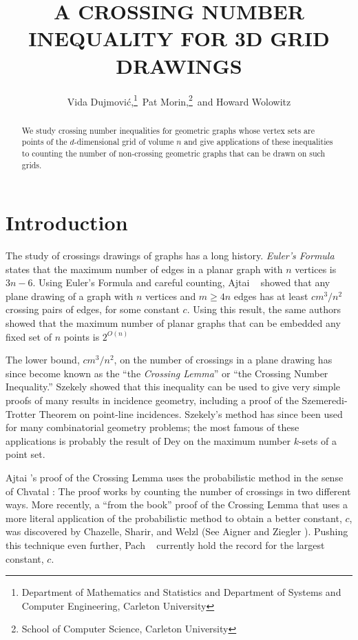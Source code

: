 \documentclass{patmorin}
\title{\MakeUppercase{A Crossing Number Inequality for 3D Grid Drawings}}
\author{Vida Dujmovi\'c,\thanks{Department of Mathematics and Statistics
and Department of Systems and Computer Engineering, Carleton University}\, Pat Morin,\thanks{School of Computer Science, Carleton University}\, and Howard Wolowitz}
\begin{document}
\maketitle

\begin{abstract}
   We study crossing number inequalities for geometric graphs whose
   vertex sets are points of the $d$-dimensional grid of volume $n$
   and give applications of these inequalities to counting the number
   of non-crossing geometric graphs that can be drawn on such grids.
\end{abstract}

\section{Introduction}

The study of crossings drawings of graphs has a long history.
\emph{Euler's Formula} states that the maximum number of edges in a
planar graph with $n$ vertices is $3n-6$.  Using Euler's Formula and
careful counting, Ajtai \etal\ \cite{S} showed that any plane drawing of
a graph with $n$ vertices and $m\ge 4n$ edges has at least $c m^3/n^2$
crossing pairs of edges, for some constant $c$.  Using this result,
the same authors showed that the maximum number of planar graphs that
can be embedded any fixed set of $n$ points is $2^{O(n)}$

The lower bound, $cm^3/n^2$, on the number of crossings in a plane drawing
has since become known as the ``the \emph{Crossing Lemma}'' or ``the Crossing
Number Inequality.''  Szekely \cite{s} showed that this inequality
can be used to give very simple proofs of many results in incidence
geometry, including a proof of the Szemeredi-Trotter Theorem on point-line
incidences.  Szekely's method has since been used for many combinatorial
geometry problems; the most famous of these applications is probably the
result of Dey \cite{d98} on the maximum number $k$-sets of a point set.

Ajtai \etal's proof of the Crossing Lemma uses the probabilistic method
in the sense of Chvatal \cite{cXX}: The proof works by counting the
number of crossings in two different ways.  More recently, a ``from the
book'' proof of the Crossing Lemma that uses a more literal application
of the probabilistic method to obtain a better constant, $c$, was
discovered by Chazelle, Sharir, and Welzl (See Aigner and Ziegler
\cite[Theorem~XX]{azXX}).  Pushing this technique even further, Pach
\etal\ \cite{pdxx} currently hold the record for the largest constant,
$c$.
\end{document}
